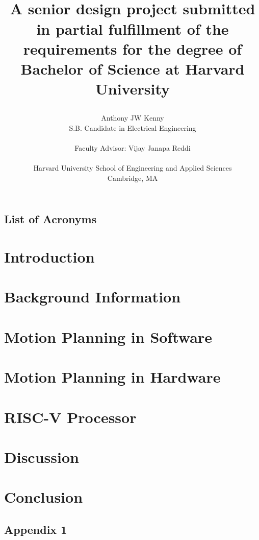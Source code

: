 \documentclass[
    11pt,           %
    letterpaper,    %
    draft,          %
    oneside         %
]{report}           %
\title{\textsc{\masterThesisTitle} \\ 
    \bigskip
    \small{A senior design project submitted in partial fulfillment of the requirements for the degree of Bachelor of Science at Harvard University} \\
\author{Anthony JW Kenny \\
        \small{S.B. Candidate in Electrical Engineering} \\ \\
        Faculty Advisor: Vijay Janapa Reddi \\ \\
        Harvard University School of Engineering and Applied Sciences \\
        \small{Cambridge, MA}}
\masterDateAndVersion}
\begin{document}
\maketitle


    
    \clearpage

    \tableofcontents
    \clearpage

    \section*{List of Acronyms}
    

    \listoffigures

    \listoftables


\chapter{Introduction}
    


\chapter{Background Information}


\chapter{Motion Planning in Software}

\chapter{Motion Planning in Hardware}

\chapter{RISC-V Processor}

\chapter{Discussion}

\chapter{Conclusion}




\begin{appendices}

\chapter{Appendix 1}

\end{appendices}

\clearpage
\end{document}
